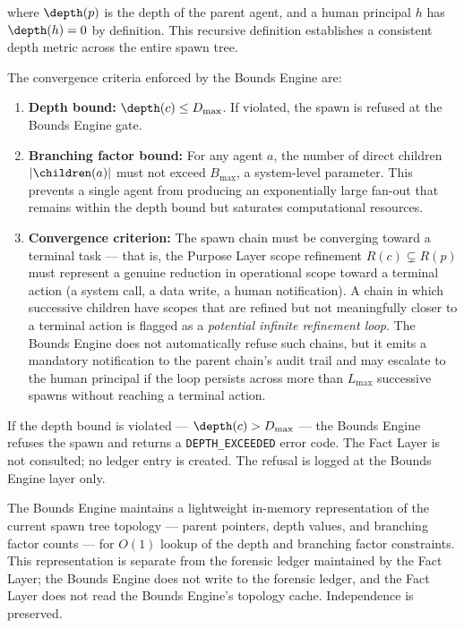 where $\depth(p)$ is the depth of the parent agent, and a human principal $h$ has $\depth(h) = 0$ by definition. This recursive definition establishes a consistent depth metric across the entire spawn tree.

The convergence criteria enforced by the Bounds Engine are:

\begin{enumerate}
    \item \textbf{Depth bound:} $\depth(c) \leq D_{\max}$. If violated, the spawn is refused at the Bounds Engine gate.
    \item \textbf{Branching factor bound:} For any agent $a$, the number of direct children $| \children(a) |$ must not exceed $B_{\max}$, a system-level parameter. This prevents a single agent from producing an exponentially large fan-out that remains within the depth bound but saturates computational resources.
    \item \textbf{Convergence criterion:} The spawn chain must be converging toward a terminal task — that is, the Purpose Layer scope refinement $R(c) \subsetneq R(p)$ must represent a genuine reduction in operational scope toward a terminal action (a system call, a data write, a human notification). A chain in which successive children have scopes that are refined but not meaningfully closer to a terminal action is flagged as a \emph{potential infinite refinement loop}. The Bounds Engine does not automatically refuse such chains, but it emits a mandatory notification to the parent chain's audit trail and may escalate to the human principal if the loop persists across more than $L_{\max}$ successive spawns without reaching a terminal action.
\end{enumerate}

If the depth bound is violated — $\depth(c) > D_{\max}$ — the Bounds Engine refuses the spawn and returns a \texttt{DEPTH\_EXCEEDED} error code. The Fact Layer is not consulted; no ledger entry is created. The refusal is logged at the Bounds Engine layer only.

The Bounds Engine maintains a lightweight in-memory representation of the current spawn tree topology — parent pointers, depth values, and branching factor counts — for $O(1)$ lookup of the depth and branching factor constraints. This representation is separate from the forensic ledger maintained by the Fact Layer; the Bounds Engine does not write to the forensic ledger, and the Fact Layer does not read the Bounds Engine's topology cache. Independence is preserved.

